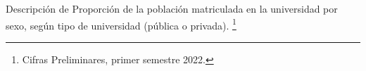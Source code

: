 Descripción de Proporción de la población matriculada en la universidad por sexo, según tipo de universidad (pública o privada). \footnote{Cifras Preliminares, primer semestre 2022.}